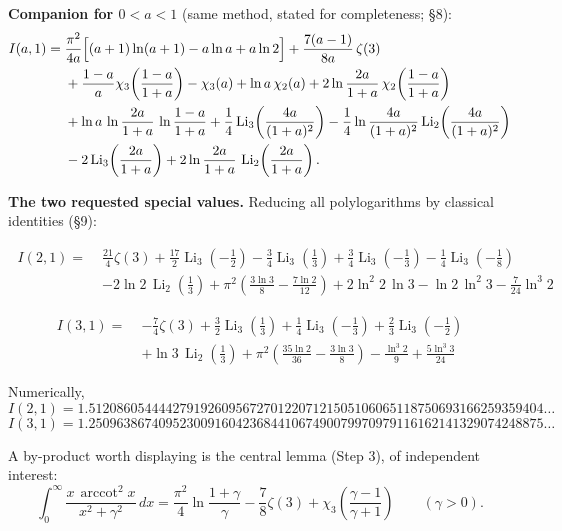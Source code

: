 \documentclass[11pt]{article}
\theoremstyle{remark}
\begin{document}
\textbf{Companion for $0<a<1$} (same method, stated for completeness; \S8):
\[\begin{aligned}
I(a,1)=\;&\frac{\pi^2}{4a}\Bigl[(a+1)\ln(a+1)-a\ln a+a\ln2\Bigr]+\frac{7(a-1)}{8a}\,\zeta(3)\\
&+\frac{1-a}{a}\chi_3\!\left(\frac{1-a}{1+a}\right)-\chi_3(a)+\ln a\,\chi_2(a)+2\ln\frac{2a}{1+a}\,\chi_2\!\left(\frac{1-a}{1+a}\right)\\
&+\ln a\,\ln\frac{2a}{1+a}\,\ln\frac{1-a}{1+a}
+\frac14\operatorname{Li}_3\!\left(\frac{4a}{(1+a)^2}\right)-\frac14\ln\frac{4a}{(1+a)^2}\operatorname{Li}_2\!\left(\frac{4a}{(1+a)^2}\right)\\
&-2\operatorname{Li}_3\!\left(\frac{2a}{1+a}\right)+2\ln\frac{2a}{1+a}\,\operatorname{Li}_2\!\left(\frac{2a}{1+a}\right).
\end{aligned}\]

\textbf{The two requested special values.} Reducing all polylogarithms by classical identities (\S9):

\[\boxed{\;\begin{aligned}
I(2,1)=\;&\frac{21}{4}\zeta(3)+\frac{17}{2}\operatorname{Li}_3\!\left(-\tfrac12\right)
-\frac34\operatorname{Li}_3\!\left(\tfrac13\right)+\frac34\operatorname{Li}_3\!\left(-\tfrac13\right)
-\frac14\operatorname{Li}_3\!\left(-\tfrac18\right)\\
&-2\ln 2\,\operatorname{Li}_2\!\left(\tfrac13\right)
+\pi^2\!\left(\frac{3\ln 3}{8}-\frac{7\ln 2}{12}\right)
+2\ln^2 2\,\ln 3-\ln 2\,\ln^2 3-\frac{7}{24}\ln^3 2
\end{aligned}\;}\]

\[\boxed{\;\begin{aligned}
I(3,1)=\;&-\frac74\zeta(3)+\frac32\operatorname{Li}_3\!\left(\tfrac13\right)+\frac14\operatorname{Li}_3\!\left(-\tfrac13\right)+\frac23\operatorname{Li}_3\!\left(-\tfrac12\right)\\
&+\ln 3\,\operatorname{Li}_2\!\left(\tfrac13\right)
+\pi^2\!\left(\frac{35\ln 2}{36}-\frac{3\ln 3}{8}\right)-\frac{\ln^3 2}{9}+\frac{5\ln^3 3}{24}
\end{aligned}\;}\]

Numerically,
\[I(2,1)=1.51208605444427919260956727012207121505106065118750693166259359404\ldots\]
\[I(3,1)=1.25096386740952300916042368441067490079970979116162141329074248875\ldots\]

A by-product worth displaying is the central lemma (Step 3), of independent interest:
\[\int_0^\infty\frac{x\,\operatorname{arccot}^2 x}{x^2+\gamma^2}\,dx
=\frac{\pi^2}{4}\ln\frac{1+\gamma}{\gamma}-\frac78\zeta(3)+\chi_3\!\left(\frac{\gamma-1}{\gamma+1}\right)\qquad(\gamma>0).\]
\end{document}
